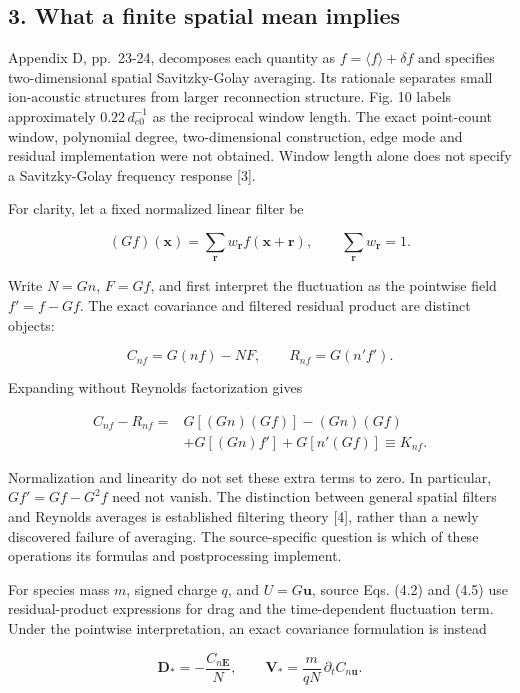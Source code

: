 \subsection{3. What a finite spatial mean
implies}\label{what-a-finite-spatial-mean-implies}

Appendix D, pp.~23-24, decomposes each quantity as
\(f=\langle f\rangle+\delta f\) and specifies two-dimensional spatial
Savitzky-Golay averaging. Its rationale separates small ion-acoustic
structures from larger reconnection structure. Fig. 10 labels
approximately \(0.22\,d_{e0}^{-1}\) as the reciprocal window length. The
exact point-count window, polynomial degree, two-dimensional
construction, edge mode and residual implementation were not obtained.
Window length alone does not specify a Savitzky-Golay frequency response
{[}3{]}.

For clarity, let a fixed normalized linear filter be

\[
(Gf)(\boldsymbol{x})=\sum_{\boldsymbol r}w_{\boldsymbol r}
f(\boldsymbol{x}+\boldsymbol r),\qquad
\sum_{\boldsymbol r}w_{\boldsymbol r}=1.\tag{6}
\]

Write \(N=Gn\), \(F=Gf\), and first interpret the fluctuation as the
pointwise field \(f'=f-Gf\). The exact covariance and filtered residual
product are distinct objects:

\[
C_{nf}=G(nf)-NF,\qquad R_{nf}=G(n'f').\tag{7}
\]

Expanding without Reynolds factorization gives

\[
\begin{aligned}
C_{nf}-R_{nf}={}&G[(Gn)(Gf)]-(Gn)(Gf)\\
&+G[(Gn)f']+G[n'(Gf)]\equiv K_{nf}.
\end{aligned}\tag{8}
\]

Normalization and linearity do not set these extra terms to zero. In
particular, \(Gf'=Gf-G^2f\) need not vanish. The distinction between
general spatial filters and Reynolds averages is established filtering
theory {[}4{]}, rather than a newly discovered failure of averaging. The
source-specific question is which of these operations its formulas and
postprocessing implement.

For species mass \(m\), signed charge \(q\), and \(U=G\boldsymbol u\),
source Eqs. (4.2) and (4.5) use residual-product expressions for drag
and the time-dependent fluctuation term. Under the pointwise
interpretation, an exact covariance formulation is instead

\[
\boldsymbol D_*=-\frac{C_{n\boldsymbol E}}{N},\qquad
\boldsymbol V_*=\frac{m}{qN}\,\partial_t C_{n\boldsymbol u}.\tag{9}
\]

